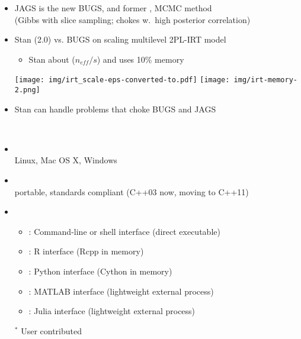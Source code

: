 \documentclass[10pt]{report}
\newcommand{\sld}[1]{\newpage{\noindent\LARGE \ \ \
    \textcolor{MidnightBlue}{\bfseries #1}}\vspace*{4pt}}
\newcommand{\spc}{\hspace*{0.25in}}
\newcommand{\myemph}[1]{{\color{MidnightBlue}{\bfseries #1}}}
\newcommand{\mypart}[2]{{\newpage 
    \mbox{ }
    \vfill
    \noindent\spc\color{MidnightBlue}{\LARGE\bfseries #1\\[10pt]\spc\Huge{#2}}
    \vfill\vfill}
  \mbox{ }}
\begin{document}
\sld{Stan vs. JAGS (BUGS)}
\begin{itemize}
\item JAGS is the new BUGS, and former \myemph{state-of-the-art}, \myemph{black-box} MCMC method
  \\ {\footnotesize (Gibbs with slice sampling; chokes w.\ high posterior correlation)}
\item Stan (2.0) vs. BUGS on scaling multilevel 2PL-IRT model
  \vspace*{-4pt}
  \begin{itemize}\footnotesize
  \item Stan about \myemph{10 times faster}  ($n_{eff}/s$) and uses
    10\% memory
  \end{itemize}
  \vspace*{-3pt}
  \vfill
  \hspace*{-12pt}
  \texttt{[image: img/irt\_scale-eps-converted-to.pdf]}
  \texttt{[image: img/irt-memory-2.png]}
\item Stan can handle problems that choke BUGS and JAGS
\end{itemize}

\mypart{Part I}{Stan Front End}

\sld{Platforms and Interfaces}

\begin{itemize}
\item \myemph{Platforms}
  \\
  Linux, Mac OS X, Windows
\item \myemph{C++ API}
  \\
  {\footnotesize portable, standards compliant (C++03 now, moving to C++11)}
\item \myemph{Interfaces}
  \vspace*{-4pt}
  \begin{itemize}\footnotesize
  \item \myemph{CmdStan}: Command-line or shell interface (direct executable)
  \item \myemph{RStan}: R interface (Rcpp in memory)
  \item \myemph{PyStan}: Python interface (Cython in memory)
  \item \myemph{MatlabStan$^*$}: MATLAB interface (lightweight external process)
  \item \myemph{Stan.jl$^*$}: Julia interface (lightweight external process)
  \end{itemize}
  {\footnotesize ${}^*$ User contributed}
\end{itemize}
\vfill
\end{document}
